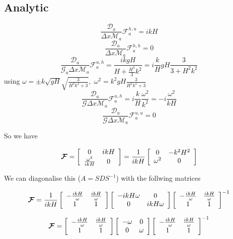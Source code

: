\documentclass[12pt]{article}
\begin{document}
\subsection{Analytic}

\[\frac{\mathcal{D}_a}{\Delta x\mathcal{M}_a}\mathcal{F}^{h,u}_a = ikH\]
\[\frac{\mathcal{D}_a}{\Delta x\mathcal{M}_a}\mathcal{F}^{h,h}_a = 0\]
\[\frac{\mathcal{D}_a}{\mathcal{G}_a\Delta x\mathcal{M}_a}\mathcal{F}^{u,h}_a = \frac{ikgH}{H + \frac{H^3}{3}k^2} = i\frac{k}{H} gH \frac{3}{3 + H^2k^2} \]
using $\omega = \pm k \sqrt{gH}\sqrt{\frac{3}{H^2k^2 + 3}}, $ $\omega^2 =  k^2 gH\frac{3}{H^2k^2 + 3}$
\[\frac{\mathcal{D}_a}{\mathcal{G}\Delta x\mathcal{M}_a}\mathcal{F}^{u,h}_a = i\frac{k}{H} \frac{\omega^2}{k^2}  = -i \frac{\omega^2}{kH}\]
\[\frac{\mathcal{D}_a}{\mathcal{G}\Delta x\mathcal{M}_a}\mathcal{F}^{u,u}_a = 0\]

So we have

\[\boldsymbol{\mathcal{F}} = \left[\begin{array}{c c}
0 & ikH \\ \frac{\omega^2}{ikH} &  0
\end{array}\right]  = \frac{1}{ikH} \left[\begin{array}{c c}
0 & -k^2H^2 \\ \omega^2 &  0
\end{array}\right] \]

We can diagonalise this ($A = S D S^{-1}$) with the follwing matrices

\[\boldsymbol{\mathcal{F}} = \frac{1}{ikH}\left[\begin{array}{c c}
- \frac{i kH}{\omega} & \frac{i kH}{\omega} \\ 1 &  1
\end{array}\right]  \left[\begin{array}{c c}
- i kH\omega & 0 \\ 0 &  i kH\omega
\end{array}\right] \left[\begin{array}{c c}
- \frac{i kH}{\omega} & \frac{i kH}{\omega} \\ 1 &  1
\end{array}\right]^{-1}\]

\[\boldsymbol{\mathcal{F}} = \left[\begin{array}{c c}
- \frac{i kH}{\omega} & \frac{i kH}{\omega} \\ 1 &  1
\end{array}\right]  \left[\begin{array}{c c}
- \omega & 0 \\ 0 &  \omega
\end{array}\right] \left[\begin{array}{c c}
- \frac{i kH}{\omega} & \frac{i kH}{\omega} \\ 1 &  1
\end{array}\right]^{-1}\]
\end{document}

